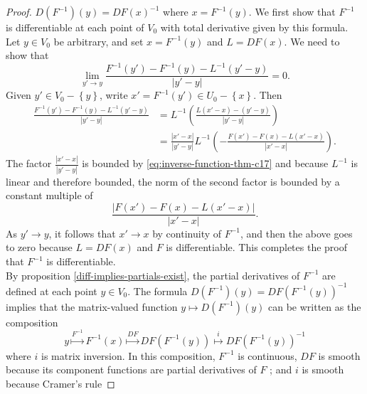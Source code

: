 \documentclass[reqno]{amsart}
\theoremstyle{plain}%
\theoremstyle{definition}
\theoremstyle{remark}
\begin{document}
\begin{proof}
        $D\left( F^{-1} \right) (y) = DF (x)^{-1}$ where
        $x = F^{-1}(y)$. We first show that $F^{-1}$ is differentiable at each
        point of $V_0$ with total derivative given by this formula.\\
        Let $y \in V_0$ be arbitrary, and set $x = F^{-1}(y)$ and 
        $L = DF(x)$. We need to show that
        \[
        \lim_{y' \to y} \frac{F^{-1}(y') - F^{-1}(y) - L^{-1}(y'-y)}{\left| y'-y \right| }
        = 0.
        \] 
        Given $y' \in V_0 - \left\{ y \right\} $, write
        $x' = F^{-1}(y') \in U_0 - \left\{ x \right\} $. Then
        \begin{align*}
            \frac{F^{-1}(y')- F^{-1}(y) - L^{-1}(y'-y)}{\left| y'-y \right| }
            &= L^{-1} \left( \frac{L(x'-x) - \left( y'-y \right) }{
            \left| y'-y \right| } \right) \\
            &= \frac{\left| x'-x \right| }{\left| y'-y \right| }
            L^{-1}\left( - \frac{F(x')- F(x) - L(x'-x)}{\left| x'-x \right|
            } \right) .
        \end{align*}
        The factor  $\frac{\left| x'-x \right| }{\left| y'-y \right| }$ is bounded
        by \eqref{eq:inverse-function-thm-c17} and because
         $L^{-1}$ is linear and therefore bounded, the norm of the second factor
         is bounded by a constant multiple of
         \[
         \frac{\left| F(x') - F(x) - L(x'-x) \right| }{\left| x'-x \right| }.
         \] 
         As $y' \to y$, it follows that $x' \to x$ by continuity of $F^{-1}$, and
         then the above goes to  zero because $L = DF(x)$ and $F$ is
         differentiable. This completes the proof that $F^{-1}$ is
         differentiable.\\
         \linebreak
         By proposition \ref{diff-implies-partials-exist}, the partial derivatives
         of $F^{-1}$ are defined at each point $y \in V_0$. The formula
         $D\left( F^{-1} \right) (y) = DF \left( F^{-1}(y) \right)^{-1}$ implies
         that the matrix-valued function
         $y \mapsto D\left( F^{-1} \right) (y)$ can be written as the composition
         \[
         y \stackrel{F^{-1}}{\mapsto } F^{-1}(x) \stackrel{DF}{\mapsto } 
         DF\left( F^{-1}(y) \right) \stackrel{i}{\mapsto } 
         DF\left( F^{-1}(y) \right)^{-1}
         \tag{$\eta$}\label{eq:inverse-function-thm-c20}
         \] 
         where $i$ is matrix inversion. In this composition,
         $F^{-1}$ is continuous, $DF$ is smooth because its component functions are
         partial derivatives of $F$ ; and $i$ is smooth because Cramer's rule

\end{proof}
\end{document}
